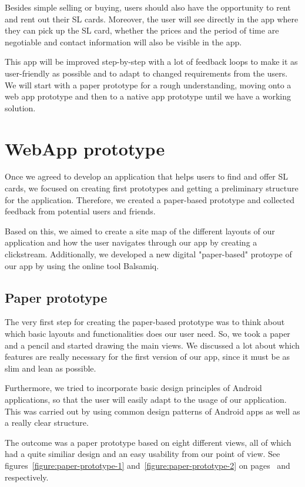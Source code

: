 \documentclass[11pt,twoside,a4paper]{report}
\begin{document}
Besides simple selling or buying, users should also have the opportunity to rent and rent out their SL cards. Moreover, the user will see directly in the app where they can pick up the SL card, whether the prices and the period of time are negotiable and contact information will also be visible in the app.

This app will be improved step-by-step with a lot of feedback loops to make it as user-friendly as possible and to adapt to changed requirements from the users. We will start with a paper prototype for a rough understanding, moving onto a web app prototype and then to a native app prototype until we have a working solution.

\chapter{WebApp prototype}

Once we agreed to develop an application that helps users to find and offer SL cards, we focused on creating first prototypes and getting a preliminary structure for the application. Therefore, we created a paper-based prototype and collected feedback from potential users and friends.

Based on this, we aimed to create a site map of the different layouts of our application and how the user navigates through our app by creating a clickstream. Additionally, we developed a new digital "paper-based" protoype of our app by using the online tool Balsamiq.

\section{Paper prototype}

The very first step for creating the paper-based prototype was to think about which basic layouts and functionalities does our user need. So, we took a paper and a pencil and started drawing the main views. We discussed a lot about which features are really necessary for the first version of our app, since it must be as slim and lean as possible.

Furthermore, we tried to incorporate basic design principles of Android applications, so that the user will easily adapt to the usage of our application. This was carried out by using common design patterns of Android apps as well as a really clear structure.

The outcome was a paper prototype based on eight different views, all of which had a quite similiar design and an easy usability from our point of view. See figures~\ref{figure:paper-prototype-1} and~\ref{figure:paper-prototype-2} on pages~\pageref{figure:paper-prototype-1} and~\pageref{figure:paper-prototype-2} respectively.
\end{document}
